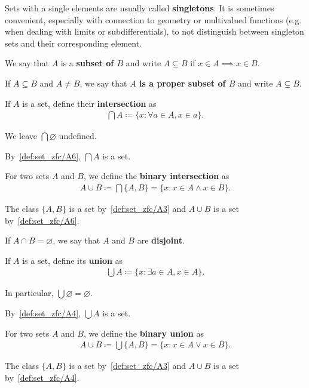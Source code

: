 \begin{note}\label{note:singleton_sets}
  Sets with a single elements are usually called \textbf{singletons}. It is sometimes convenient, especially with connection to geometry or multivalued functions (e.g. when dealing with limits or subdifferentials), to not distinguish between singleton sets and their corresponding element.
\end{note}

\begin{definition}\label{def:subset}
  We say that \( A \) is a \textbf{subset of \( B \)} and write \( A \subseteq B \) if \( x \in A \implies x \in B \).

  If \( A \subseteq B \) and \( A \neq B \), we say that \textbf{\( A \) is a proper subset of \( B \)} and write \( A \subsetneq B \).
\end{definition}

\begin{definition}\label{def:set_intersection}\cite[24]{Enderton1977}
  If \( A \) is a set, define their \textbf{intersection} as
  \begin{align*}
    \bigcap A \coloneqq \{ x \colon \forall a \in A, x \in a \}.
  \end{align*}

  We leave \( \bigcap \varnothing \) undefined.

  By~\ref{def:set_zfc/A6}, \( \bigcap A \) is a set.

  For two sets \( A \) and \( B \), we define the \textbf{binary intersection} as
  \begin{align*}
    A \cup B \coloneqq \bigcap \{ A, B \} = \{ x \colon x \in A \land x \in B \}.
  \end{align*}

  The class \( \{ A, B \} \) is a set by~\ref{def:set_zfc/A3} and \( A \cup B \) is a set by~\ref{def:set_zfc/A6}.

  If \( A \cap B = \varnothing \), we say that \( A \) and \( B \) are \textbf{disjoint}.
\end{definition}

\begin{definition}\label{def:set_union}\cite[24]{Enderton1977}
  If \( A \) is a set, define its \textbf{union} as
  \begin{align*}
    \bigcup A \coloneqq \{ x \colon \exists a \in A, x \in A \}.
  \end{align*}

  In particular, \( \bigcup \varnothing = \varnothing \).

  By~\ref{def:set_zfc/A4}, \( \bigcup A \) is a set.

  For two sets \( A \) and \( B \), we define the \textbf{binary union} as
  \begin{align*}
    A \cup B \coloneqq \bigcup \{ A, B \} = \{ x \colon x \in A \lor x \in B \}.
  \end{align*}

  The class \( \{ A, B \} \) is a set by~\ref{def:set_zfc/A3} and \( A \cup B \) is a set by~\ref{def:set_zfc/A4}.
\end{definition}

